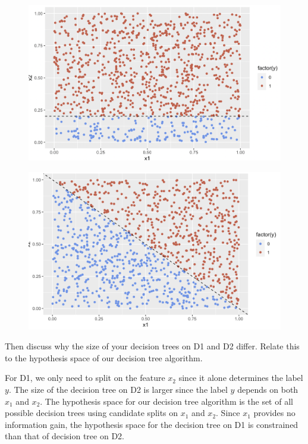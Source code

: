 \documentclass[a4paper]{article}
\theoremstyle{definition}
\newenvironment{soln}{
    \leavevmode\color{blue}\ignorespaces
}{}
\begin{document}
\begin{enumerate}
\begin{itemize}
  \begin{figure}[htbp]
    \centerline{\includegraphics[scale=0.5]{Q6a.png}}
  \end{figure}

  \begin{figure}[htbp]
    \centerline{\includegraphics[scale=0.5]{Q6b.png}}
  \end{figure}


  \end{itemize}
Then discuss why the size of your decision trees on D1 and D2 differ.  Relate this to the hypothesis space of our decision tree algorithm. \\

\begin{soln}
For D1, we only need to split on the feature $x_2$ since it alone determines the label $y$. The size of the decision tree on D2 is larger since the label $y$ depends on both $x_1$ and $x_2$. The hypothesis space for our decision tree algorithm is the set of all possible decision trees using candidate splits on $x_1$ and $x_2$. Since $x_1$ provides no information gain, the hypothesis space for the decision tree on D1 is constrained than that of decision tree on D2.
\end{soln}


\end{enumerate}
\end{document}
